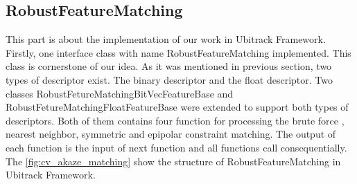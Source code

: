 \subsection {RobustFeatureMatching}
This part is about the implementation of our work in Ubitrack Framework. Firstly, one interface class with name RobustFeatureMatching implemented. This class is cornerstone of our idea. As it was mentioned in previous section, two types of descriptor exist. The binary descriptor and the float descriptor. Two classes RobustFetureMatchingBitVecFeatureBase and RobustFetureMatchingFloatFeatureBase were extended to support both types of descriptors. Both of them contains four function for processing the brute force , nearest neighbor, symmetric and epipolar constraint matching. The output of each function is the input of next function and all functions call consequentially.
The \autoref{fig:cv_akaze_matching} show the structure of RobustFeatureMatching in Ubitrack Framework.

